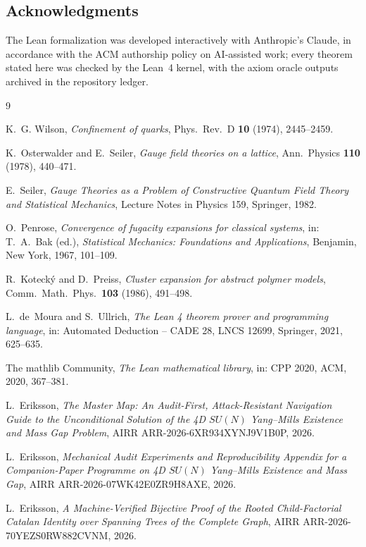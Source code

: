 \documentclass[11pt]{article}
\theoremstyle{remark}
\begin{document}
\subsection*{Acknowledgments}
The Lean formalization was developed interactively with Anthropic's
Claude, in accordance with the ACM authorship policy on AI-assisted work;
every theorem stated here was checked by the Lean~4 kernel, with the axiom
oracle outputs archived in the repository ledger.

\begin{thebibliography}{9}

K.~G. Wilson,
\emph{Confinement of quarks},
Phys.\ Rev.\ D \textbf{10} (1974), 2445--2459.

K.~Osterwalder and E.~Seiler,
\emph{Gauge field theories on a lattice},
Ann.\ Physics \textbf{110} (1978), 440--471.

E.~Seiler,
\emph{Gauge Theories as a Problem of Constructive Quantum Field Theory and
Statistical Mechanics},
Lecture Notes in Physics 159, Springer, 1982.

O.~Penrose,
\emph{Convergence of fugacity expansions for classical systems},
in: T.~A.~Bak (ed.), \emph{Statistical Mechanics: Foundations and
Applications}, Benjamin, New York, 1967, 101--109.

R.~Koteck\'y and D.~Preiss,
\emph{Cluster expansion for abstract polymer models},
Comm.\ Math.\ Phys.\ \textbf{103} (1986), 491--498.

L.~de~Moura and S.~Ullrich,
\emph{The Lean 4 theorem prover and programming language},
in: Automated Deduction -- CADE 28, LNCS 12699, Springer, 2021, 625--635.

The mathlib Community,
\emph{The Lean mathematical library},
in: CPP 2020, ACM, 2020, 367--381.

L.~Eriksson,
\emph{The Master Map: An Audit-First, Attack-Resistant Navigation Guide to
the Unconditional Solution of the 4D $SU(N)$ Yang--Mills Existence and Mass
Gap Problem},
AIRR ARR-2026-6XR934XYNJ9V1B0P, 2026.

L.~Eriksson,
\emph{Mechanical Audit Experiments and Reproducibility Appendix for a
Companion-Paper Programme on 4D $SU(N)$ Yang--Mills Existence and Mass
Gap},
AIRR ARR-2026-07WK42E0ZR9H8AXE, 2026.

L.~Eriksson,
\emph{A Machine-Verified Bijective Proof of the Rooted Child-Factorial
Catalan Identity over Spanning Trees of the Complete Graph},
AIRR ARR-2026-70YEZS0RW882CVNM, 2026.

\end{thebibliography}
\end{document}
